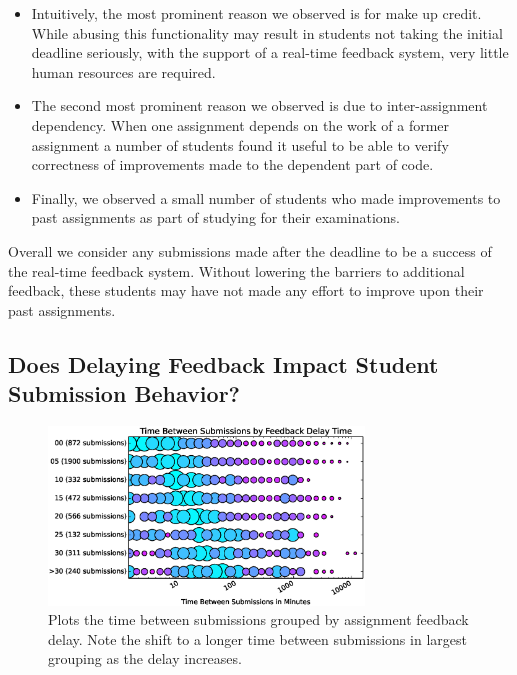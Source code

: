 \begin{itemize}
\item Intuitively, the most prominent reason we observed is for make up
  credit. While abusing this functionality may result in students not taking
  the initial deadline seriously, with the support of a real-time feedback
  system, very little human resources are required.
\item The second most prominent reason we observed is due to inter-assignment
  dependency. When one assignment depends on the work of a former assignment a
  number of students found it useful to be able to verify correctness of
  improvements made to the dependent part of code.
\item Finally, we observed a small number of students who made improvements to
  past assignments as part of studying for their examinations.
\end{itemize}

Overall we consider any submissions made after the deadline to be a success of
the real-time feedback system. Without lowering the barriers to additional
feedback, these students may have not made any effort to improve upon their
past assignments.

\subsection{Does Delaying Feedback Impact Student Submission Behavior?}

\begin{figure}[!t]
\centering \includegraphics[width=3.3in]{graphs/Time_Between_Submissions_by_Feedback_Delay_Time.eps}
\caption{Plots the time between submissions grouped by assignment feedback
  delay. Note the shift to a longer time between submissions in largest
  grouping as the delay increases.}
\end{figure}

